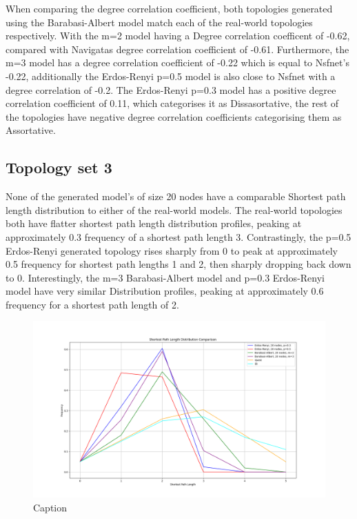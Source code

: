 When comparing the degree correlation coefficient, both topologies generated using the Barabasi-Albert model match each of the real-world topologies respectively. With the m=2 model having a Degree correlation coefficent of -0.62, compared with Navigatas degree correlation coefficient of -0.61. Furthermore, the m=3 model has a degree correlation coefficient of -0.22 which is equal to Nsfnet's -0.22, additionally the Erdos-Renyi p=0.5 model is also close to Nsfnet with a degree correlation of -0.2. The Erdos-Renyi p=0.3 model has a positive degree correlation coefficient of 0.11, which categorises it as Dissasortative, the rest of the topologies have negative degree correlation coefficients categorising them as Assortative.

\subsection{Topology set 3}
None of the generated model's of size 20 nodes have a comparable Shortest path length distribution to either of the real-world models. The real-world topologies both have flatter shortest path length distribution profiles, peaking at approximately 0.3 frequency of a shortest path length 3. Contrastingly, the p=0.5 Erdos-Renyi generated topology rises sharply from 0 to peak at approximately 0.5 frequency for shortest path lengths 1 and 2, then sharply dropping back down to 0. Interestingly, the m=3 Barabasi-Albert model and p=0.3 Erdos-Renyi model have very similar Distribution profiles, peaking at approximately 0.6 frequency for a shortest path length of 2. 

\begin{figure}
    \centering
    \includegraphics[width=0.9\linewidth]{images/FINAL-TOPO-COMP/line-20.png}
    \caption{Caption}
    \label{fig:enter-label}
\end{figure}

